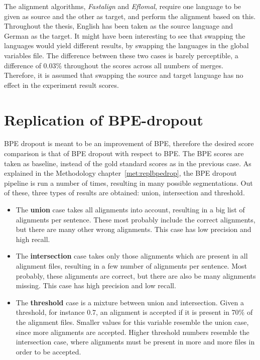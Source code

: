 The alignment algorithms, \emph{Fastalign} and \emph{Eflomal}, require one language to be given as source and the other as target, and perform the alignment based on this. Throughout the thesis, English has been taken as the source language and German as the target. It might have been interesting to see that swapping the languages would yield different results, by swapping the languages in the global variables file. The difference between these two cases is barely perceptible, a difference of 0.03\% throughout the scores across all numbers of merges. Therefore, it is assumed that swapping the source and target language has no effect in the experiment result scores.

\section{Replication of BPE-dropout}

BPE dropout is meant to be an improvement of BPE, therefore the desired score comparison is that of BPE dropout with respect to BPE. The BPE scores are taken as baseline, instead of the gold standard scores as in the previous case. As explained in the Methodology chapter~\ref{met:replbpedrop}, the BPE dropout pipeline is run a number of times, resulting in many possible segmentations. Out of these, three types of results are obtained: union, intersection and threshold.

\begin{itemize}
	\item The \textbf{union} case takes all alignments into account, resulting in a big list of alignments per sentence. These most probably include the correct alignments, but there are many other wrong alignments. This case has low precision and high recall.
	\item The \textbf{intersection} case takes only those alignments which are present in all alignment files, resulting in a few number of alignments per sentence. Most probably, these alignments are correct, but there are also be many alignments missing. This case has high precision and low recall.
	\item The \textbf{threshold} case is a mixture between union and intersection. Given a threshold, for instance 0.7, an alignment is accepted if it is present in 70\% of the alignment files. Smaller values for this variable resemble the union case, since more alignments are accepted. Higher threshold numbers resemble the intersection case, where alignments must be present in more and more files in order to be accepted.
\end{itemize}

